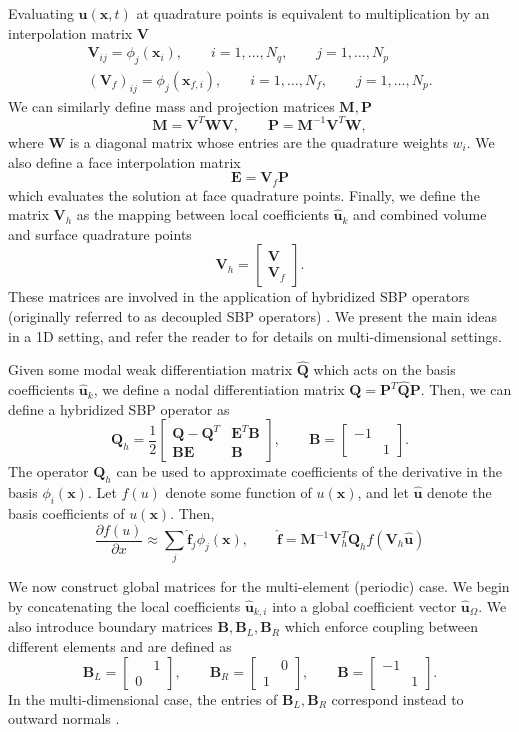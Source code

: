\documentclass{article}
\renewcommand{\hat}{\widehat}
\newcommand{\pd}[2]{\frac{\partial#1}{\partial#2}}
\newcommand{\LRp}[1]{\left( #1 \right)}
\newcommand{\eq}[1]{\begin{align*}#1\end{align*}}
\newcommand{\bmat}[1]{\begin{bmatrix}#1\end{bmatrix}}
\begin{document}
Evaluating $\bm{u}(\bm{x},t)$ at quadrature points is equivalent to multiplication by an interpolation matrix $\bm{V}$
\eq{
{\bm{V}}_{ij} = \phi_j(\bm{x}_i), \qquad i = 1,\ldots, N_q, \qquad j = 1,\ldots, N_p\\
\LRp{\bm{V}_f}_{ij} = \phi_j(\bm{x}_{f,i}), \qquad i = 1,\ldots, N_f, \qquad j = 1,\ldots, N_p.
}
We can similarly define mass and projection matrices $\bm{M}, \bm{P}$ 
\[
\bm{M} = \bm{V}^T\bm{W}\bm{V}, \qquad \bm{P} = \bm{M}^{-1}\bm{V}^T\bm{W},
\]
where $\bm{W}$ is a diagonal matrix whose entries are the quadrature weights $w_i$.  We also define a face interpolation matrix
\[
\bm{E} = \bm{V}_f\bm{P}
\]
which evaluates the solution at face quadrature points.  Finally, we define the matrix $\bm{V}_h$ as the mapping between local coefficients $\hat{\bm{u}}_k$ and combined volume and surface quadrature points
\[
\bm{V}_h = \bmat{\bm{V} \\ \bm{V}_f}.
\]
These matrices are involved in the application of hybridized SBP operators (originally referred to as decoupled SBP operators) \cite{chan2017discretely, chenreview}.  We present the main ideas in a 1D setting, and refer the reader to \cite{crean2018entropy, chan2017discretely, chan2019skew} for details on multi-dimensional settings.  

Given some modal weak differentiation matrix $\hat{\bm{Q}}$ which acts on the basis coefficients $\hat{\bm{u}}_k$, we define a nodal differentiation matrix $\bm{Q} = \bm{P}^T\hat{\bm{Q}}\bm{P}$.  Then, we can define a hybridized SBP operator as 
\[
\bm{Q}_h = \frac{1}{2}\bmat{\bm{Q}-\bm{Q}^T & \bm{E}^T\bm{B} \\
\bm{B}\bm{E} & \bm{B}}, \qquad \bm{B} = \bmat{-1 & \\ & 1}.  
\]
The operator $\bm{Q}_h$ can be used to approximate coefficients of the derivative in the basis $\phi_i(\bm{x})$.  Let $f(u)$ denote some function of $u(\bm{x})$, and let $\hat{\bm{u}}$ denote the basis coefficients of $u(\bm{x})$.  Then, 
\[
\pd{f(u)}{x}\approx \sum_j {\hat{\bm{f}}}_j \phi_j(\bm{x}), \qquad \hat{\bm{f}} = \bm{M}^{-1}\bm{V}_h^T\bm{Q}_h f\LRp{\bm{V}_h\hat{\bm{u}}}
\]

We now construct global matrices for the multi-element (periodic) case.  We begin by concatenating the local coefficients $\hat{\bm{u}}_{k,i}$ into a global coefficient vector $\hat{\bm{u}}_{\Omega}$.  We also introduce boundary matrices $\bm{B}, \bm{B}_L,\bm{B}_R$ which enforce coupling between different elements and are defined as 
\[
\bm{B}_L = \bmat{ & 1\\0 &}, \qquad \bm{B}_R = \bmat{ &0 \\1  &}, \qquad \bm{B} = \bmat{-1 & \\ & 1}.
\]
In the multi-dimensional case, the entries of $\bm{B}_L, \bm{B}_R$ correspond instead to outward normals \cite{crean2018entropy, chan2017discretely}.  
\end{document}
